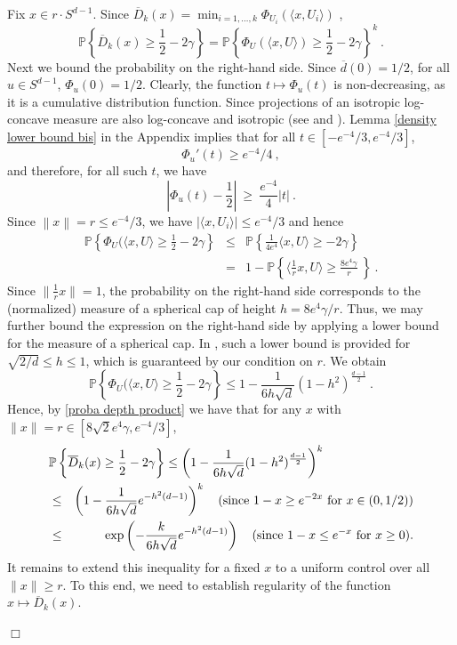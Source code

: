 \documentclass[12pt]{article}
\newcommand{\PP}{\mathbb{P}}
\newcommand{\ol}{\overline}
\newcommand{\qed}{\hfill $\Box$}
\newenvironment{proof}{\par\noindent{\bf Proof:}}{\qed \par\medskip\noindent}
\begin{document}
\begin{proof}
Fix $x\in r\cdot S^{d-1}$. Since $\ol{D}_k(x)=\min_{i=1,\dots, k} \Phi_{U_i}(\langle x,U_i \rangle )$ ,
\begin{equation}
\label{proba depth product}
  \PP\left\{ \ol{D}_k(x) \geq \frac{1}{2}-2\gamma \right\}
 = 
\PP\left\{ \Phi_{U}(\langle x,U \rangle) \geq \frac{1}{2}-2\gamma   \right\}^k~.
\end{equation}
Next we bound the probability on the right-hand side. 
Since $\ol{d}(0)=1/2$, for all $u\in S^{d-1}$, $\Phi_u(0) =
1/2$. Clearly, the function $t\mapsto \Phi_u(t)$ is
non-decreasing, as it is a cumulative distribution function. Since
projections of an isotropic log-concave measure are also log-concave
and isotropic (see \cite[Section 3]{saumard2014log} and
\cite{Pre73}). Lemma \ref{density lower bound bis} in the Appendix
implies that for all $t \in [-e^{-4}/3, e^{-4}/3]$,
\[
  \Phi_{u}'(t)\geq e^{-4}/4~,
\]  
and therefore, for all such $t$, we have
\[
  \left\lvert \Phi_u(t)-\frac{1}{2} \right\rvert \ \geq \
  \frac{e^{-4}}{4}|t|~.
\]  
Since  $\left\| x\right\| = r \le e^{-4}/3$, we have $\lvert\langle
x,U_i\rangle\rvert \leq e^{-4}/3$ and hence
\begin{eqnarray*}
  \PP\left\{ \Phi_{U}(\langle x,U \rangle \geq
  \frac{1}{2}-2\gamma \right\}
& \leq & \PP\left\{
    \frac{1}{4e^4}\langle x,U \rangle \geq -2\gamma
  \right\}  \\ 
& = &
1- \PP\left\{ \langle \frac{1}{r} x,U \rangle \geq
   \frac{8e^4\gamma}{r} \   \right\}~.
\end{eqnarray*}
Since $\|\frac{1}{r} x\| =1$, the probability on the right-hand side
corresponds to the (normalized) measure of a spherical cap of height
$h=8e^4\gamma/r$.
Thus, we may further bound the expression on the right-hand side
by applying a lower bound for the measure of a spherical cap. 
In \cite[Lemma 2.1b]{BrGrKaKlLoSi01}, such a lower bound is provided for $ \sqrt{2/d}\leq h \leq 1$, which is
guaranteed by our
condition on $r$. We obtain
\[
  \PP\left\{ \Phi_{U}(\langle 	x,U \rangle \geq \frac{1}{2}
    - 2\gamma  \right\} \leq 1 -
  \frac{1}{6h\sqrt{d}}(1-h^2)^{\frac{d-1}{2}}   ~.
\]  
Hence, by \eqref{proba depth product} we have that for any $x$ with
$\|x\|=r \in [8\sqrt{2}e^4\gamma, e^{-4}/3]$,
\begin{eqnarray}
\label{local control}
  \lefteqn{
  \PP\left\{ \ol{D}_k(x)\geq \frac{1}{2} - 2\gamma \right\}
   \leq  \left(  1 -
           \frac{1}{6h\sqrt{d}}(1-h^2)^{\frac{d-1}{2}}\right)^k }
\nonumber \\
    & \le & \left(  1 -
            \frac{1}{6h\sqrt{d}} e^{-h^2(d-1)}\right)^k
\quad \text{(since $1-x \ge e^{-2x}$ for $x\in (0,1/2)$)}
\nonumber \\
    & \le & \exp\left(-
            \frac{k}{6h\sqrt{d}} e^{-h^2(d-1)}\right)
\quad \text{(since $1-x \le e^{-x}$ for $x\ge 0$).}
\end{eqnarray}
It remains to extend this inequality for a fixed $x$ to a uniform
control over all $\|x\|\ge r$. To this end, we need to establish regularity of the
function $x\mapsto \ol{D}_k(x)$.


\end{proof}
\end{document}
